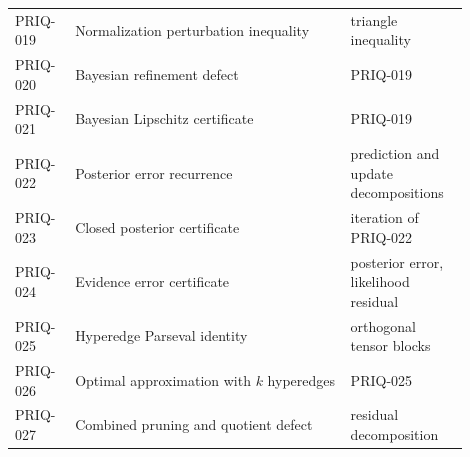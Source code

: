 \documentclass[11pt]{article}
\theoremstyle{definition}
\theoremstyle{remark}
\begin{document}
\begin{longtable}{@{}p{0.12\linewidth}p{0.55\linewidth}p{0.23\linewidth}@{}}
PRIQ-019 & Normalization perturbation inequality & triangle inequality\\
PRIQ-020 & Bayesian refinement defect & PRIQ-019\\
PRIQ-021 & Bayesian Lipschitz certificate & PRIQ-019\\
PRIQ-022 & Posterior error recurrence & prediction and update decompositions\\
PRIQ-023 & Closed posterior certificate & iteration of PRIQ-022\\
PRIQ-024 & Evidence error certificate & posterior error, likelihood residual\\
PRIQ-025 & Hyperedge Parseval identity & orthogonal tensor blocks\\
PRIQ-026 & Optimal approximation with $k$ hyperedges & PRIQ-025\\
PRIQ-027 & Combined pruning and quotient defect & residual decomposition\\
\bottomrule
\end{longtable}
\end{document}
